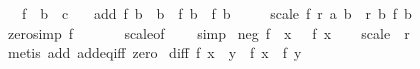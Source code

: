 \begin{isabellebody}
\ \ \ f\ {\isacharcolon}{\kern0pt}{\isacharcolon}{\kern0pt}\ {\isachardoublequoteopen}{\isacharprime}{\kern0pt}b\ {\isasymRightarrow}\ {\isacharprime}{\kern0pt}c{\isachardoublequoteclose}\isanewline
\ \ \ add{\isacharcolon}{\kern0pt}\ {\isachardoublequoteopen}f\ {\isacharparenleft}{\kern0pt}b{}\ {\isacharplus}{\kern0pt}\ b{}{\isacharparenright}{\kern0pt}\ {\isacharequal}{\kern0pt}\ f\ b{}\ {\isacharplus}{\kern0pt}\ f\ b{}{\isachardoublequoteclose}\isanewline
\ \ \ \ \ scale{\isacharcolon}{\kern0pt}\ {\isachardoublequoteopen}f\ {\isacharparenleft}{\kern0pt}r\ {\isacharasterisk}{\kern0pt}a\ b{\isacharparenright}{\kern0pt}\ {\isacharequal}{\kern0pt}\ r\ {\isacharasterisk}{\kern0pt}b\ f\ b{\isachardoublequoteclose}\isanewline
{}\isanewline
\isanewline
{}\isamarkupfalse%
\ zero{\isacharbrackleft}{\kern0pt}simp{\isacharbrackright}{\kern0pt}{\isacharcolon}{\kern0pt}\ {\isachardoublequoteopen}f\ {}\ {\isacharequal}{\kern0pt}\ {}{\isachardoublequoteclose}\isanewline
%
\isadelimproof
\ \ %
\endisadelimproof
%
\isatagproof
{}\isamarkupfalse%
\ scale{\isacharbrackleft}{\kern0pt}of\ {}\ {}{\isacharbrackright}{\kern0pt}\ \isamarkupfalse%
\ simp%
\endisatagproof
{\isafoldproof}%
%
\isadelimproof
\isanewline
%
\endisadelimproof
\isanewline
{}\isamarkupfalse%
\ neg{\isacharcolon}{\kern0pt}\ {\isachardoublequoteopen}f\ {\isacharparenleft}{\kern0pt}{\isacharminus}{\kern0pt}\ x{\isacharparenright}{\kern0pt}\ {\isacharequal}{\kern0pt}\ {\isacharminus}{\kern0pt}\ f\ x{\isachardoublequoteclose}\isanewline
%
\isadelimproof
\ \ %
\endisadelimproof
%
\isatagproof
{}\isamarkupfalse%
\ scale\ {\isacharbrackleft}{\kern0pt}\ r{\isacharequal}{\kern0pt}{\isachardoublequoteopen}{\isacharminus}{\kern0pt}{}{\isachardoublequoteclose}{\isacharbrackright}{\kern0pt}\ \isamarkupfalse%
\ {\isacharparenleft}{\kern0pt}metis\ add\ add{\isacharunderscore}{\kern0pt}eq{\isacharunderscore}{\kern0pt}{}{\isacharunderscore}{\kern0pt}iff\ zero{\isacharparenright}{\kern0pt}%
\endisatagproof
{\isafoldproof}%
%
\isadelimproof
\isanewline
%
\endisadelimproof
\isanewline
{}\isamarkupfalse%
\ diff{\isacharcolon}{\kern0pt}\ {\isachardoublequoteopen}f\ {\isacharparenleft}{\kern0pt}x\ {\isacharminus}{\kern0pt}\ y{\isacharparenright}{\kern0pt}\ {\isacharequal}{\kern0pt}\ f\ x\ {\isacharminus}{\kern0pt}\ f\ y{\isachardoublequoteclose}\isanewline

\end{isabellebody}
